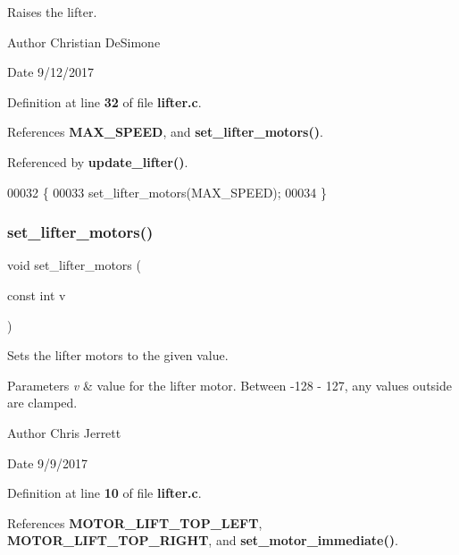 Raises the lifter. 

\begin{DoxyAuthor}{Author}
Christian De\+Simone 
\end{DoxyAuthor}
\begin{DoxyDate}{Date}
9/12/2017 
\end{DoxyDate}


Definition at line \textbf{ 32} of file \textbf{ lifter.\+c}.



References \textbf{ M\+A\+X\+\_\+\+S\+P\+E\+ED}, and \textbf{ set\+\_\+lifter\+\_\+motors()}.



Referenced by \textbf{ update\+\_\+lifter()}.


\begin{DoxyCode}
00032                    \{
00033   set_lifter_motors(MAX_SPEED);
00034 \}
\end{DoxyCode}
\mbox{\label{lifter_8c_a2cfc188f60f945c824dd7fe7b0b5f4e4}} 
\subsubsection{set\+\_\+lifter\+\_\+motors()}
{\footnotesize\ttfamily void set\+\_\+lifter\+\_\+motors (\begin{DoxyParamCaption}\item[{const int}]{v }\end{DoxyParamCaption})}



Sets the lifter motors to the given value. 


\begin{DoxyParams}{Parameters}
{\em v} & value for the lifter motor. Between -\/128 -\/ 127, any values outside are clamped. \\
\hline
\end{DoxyParams}
\begin{DoxyAuthor}{Author}
Chris Jerrett 
\end{DoxyAuthor}
\begin{DoxyDate}{Date}
9/9/2017 
\end{DoxyDate}


Definition at line \textbf{ 10} of file \textbf{ lifter.\+c}.



References \textbf{ M\+O\+T\+O\+R\+\_\+\+L\+I\+F\+T\+\_\+\+T\+O\+P\+\_\+\+L\+E\+FT}, \textbf{ M\+O\+T\+O\+R\+\_\+\+L\+I\+F\+T\+\_\+\+T\+O\+P\+\_\+\+R\+I\+G\+HT}, and \textbf{ set\+\_\+motor\+\_\+immediate()}.



